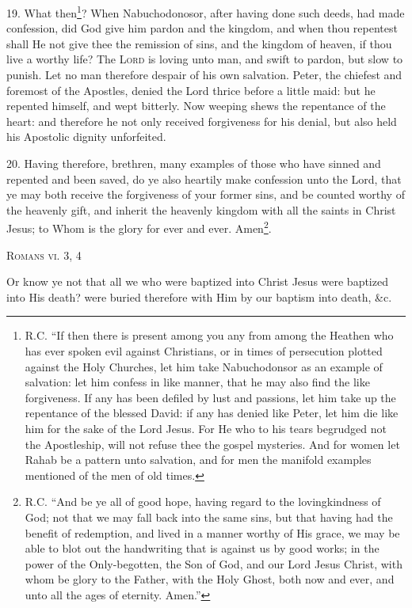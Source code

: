 19. What then\footnote{R.C. “If then there is present among you any from among the Heathen who has ever spoken evil against Christians, or in times of persecution plotted against the Holy Churches, let him take Nabuchodonsor as an example of salvation: let him confess in like manner, that he may also find the like forgiveness. If any has been defiled by lust and passions, let him take up the repentance of the blessed David: if any has denied like Peter, let him die like him for the sake of the Lord Jesus. For He who to his tears begrudged not the Apostleship, will not refuse thee the gospel mysteries. And for women let Rahab be a pattern unto salvation, and for men the manifold examples mentioned of the men of old times.}? When Nabuchodonosor, after having done such deeds, had made confession, did God give him pardon and the kingdom, and when thou repentest shall He not give thee the remission of sins, and the kingdom of heaven, if thou live a worthy life? The \textsc{Lord} is loving unto man, and swift to pardon, but slow to punish. Let no man therefore despair of his own salvation. Peter, the chiefest and foremost of the Apostles, denied the Lord thrice before a little maid: but he repented himself, and wept bitterly. Now weeping shews the repentance of the heart: and therefore he not only received forgiveness for his denial, but also held his Apostolic dignity unforfeited.

20. Having therefore, brethren, many examples of those who have sinned and repented and been saved, do ye also heartily make confession unto the Lord, that ye may both receive the forgiveness of your former sins, and be counted worthy of the heavenly gift, and inherit the heavenly kingdom with all the saints in Christ Jesus; to Whom is the glory for ever and ever. Amen\footnote{R.C. “And be ye all of good hope, having regard to the lovingkindness of God; not that we may fall back into the same sins, but that having had the benefit of redemption, and lived in a manner worthy of His grace, we may be able to blot out the handwriting that is against us by good works; in the power of the Only-begotten, the Son of God, and our Lord Jesus Christ, with whom be glory to the Father, with the Holy Ghost, both now and ever, and unto all the ages of eternity. Amen.”}.


\textsc{Romans vi. 3, 4}

Or know ye not that all we who were baptized into Christ Jesus were baptized into His death? were buried therefore with Him by our baptism into death, \&c.

